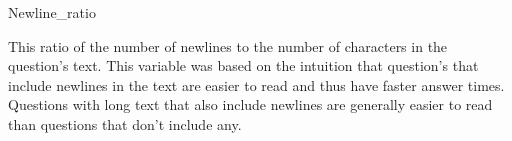 \documentclass[12pt]{article}
\begin{document}
Newline\_ratio

This ratio of the number of newlines to the number of characters in the question's text. This variable was based on the intuition that question's that include newlines in the text are easier to read and thus have faster answer times. Questions with long text that also include newlines are generally easier to read than questions that don’t include any. 



\end{document}
